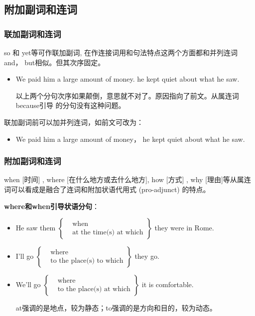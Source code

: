 \subsection{附加副词和连词}
\subsubsection{联加副词和连词}

so 和 yet等可作联加副词, 在作连接词用和句法特点这两个方面都和并列连词and，
but相似。但其次序固定。

\begin{itemize}
\item We paid him a large amount of money.  he kept quiet about what he saw.

  以上两个分句次序如果颠倒，意思就不对了。原因指向了前文。从属连词because引导
  的分句没有这种问题。
\end{itemize}

联加副词前可以加并列连词，如前文可改为：
\begin{itemize}
\item We paid him a large amount of money，  he kept quiet about what he saw.
\end{itemize}

\subsubsection{附加副词和连词}

when [时间] , where [在什么地方或去什么地方], how [方式] , why [理由]等从属连
词可以看成是融合了连词和附加状语代用式 (pro-adjunct) 的特点。

\textbf{where和when引导状语分句}：
\begin{itemize}
\item He saw them
    $\left\{
      \begin{aligned}
        &\text{when}\\
        &\text{at the time(s) at which}
      \end{aligned}
      \right\} $ they were in Rome.

\item I'll go
    $\left\{
      \begin{aligned}
        &\text{where}\\
        &\text{to the place(s) to which}
      \end{aligned}
      \right\} $ they go.

\item We'll go
    $\left\{
      \begin{aligned}
        &\text{where}\\
        &\text{to the place(s) at which}
      \end{aligned}
      \right\} $ it is comfortable.

      at强调的是地点，较为静态；to强调的是方向和目的，较为动态。
\end{itemize}

